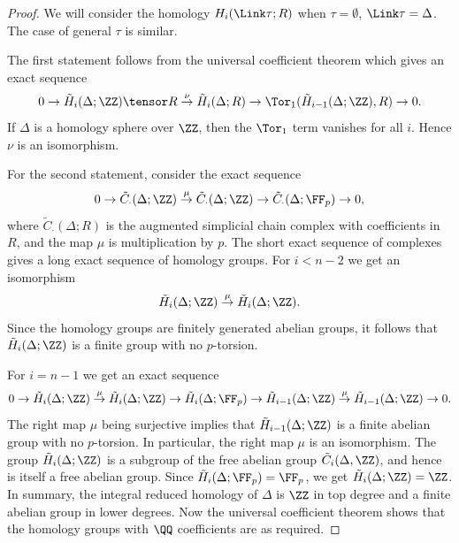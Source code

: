\begin{proof}
We will consider the homology $H_i(\Link\tau; R)$ when $\tau=\emptyset$, $\Link\tau=\Delta$. The case of general $\tau$ is similar.

The first statement follows from the universal coefficient theorem which gives an exact sequence
\[ 0\to \tilde{H}_i (\Delta; \ZZ) \tensor R \stackrel{\nu}{\to} \tilde{H}_i (\Delta; R) \to \Tor_1(\tilde{H}_{i-1} (\Delta; \ZZ), R) \to 0.\]
If $\Delta$ is a homology sphere over $\ZZ$, then the $\Tor_1$ term vanishes for all $i$. Hence $\nu$ is an isomorphism.

For the second statement, consider the exact sequence
\[  0\to \tilde{C}_\cdot(\Delta;\ZZ) \stackrel{\mu}{\to} \tilde{C}_\cdot(\Delta;\ZZ) \to \tilde{C}_\cdot(\Delta;\FF_p) \to 0,\]
where $\tilde{C}_\cdot(\Delta;R)$ is the augmented simplicial chain complex with coefficients in $R$, and the map $\mu$ is multiplication by $p$. The short exact sequence of complexes gives a long exact sequence of homology groups. For $i< n-2$ we get an isomorphism
\[ \tilde{H}_i(\Delta;\ZZ) \stackrel{\mu}{\to} \tilde{H}_i(\Delta;\ZZ).\]
Since the homology groups are finitely generated abelian groups, it follows that $\tilde{H}_i(\Delta;\ZZ)$ is a finite group with no $p$-torsion. 

For $i=n-1$ we get an exact sequence 
\[  0\to \tilde{H}_i(\Delta;\ZZ) \stackrel{\mu}{\to} \tilde{H}_i(\Delta;\ZZ) \to \tilde{H}_i(\Delta;\FF_p) \to \tilde{H}_{i-1}(\Delta;\ZZ) \stackrel{\mu}{\to} \tilde{H}_{i-1}(\Delta;\ZZ) \to 0.\]
The right map $\mu$ being surjective implies that $\tilde{H}_{i-1}(\Delta;\ZZ)$ is a finite abelian group with no $p$-torsion. In particular, the right map $\mu$ is an isomorphism. The group $\tilde{H}_i(\Delta;\ZZ)$ is a subgroup of the free abelian group $\tilde{C}_i(\Delta,\ZZ)$, and hence is itself a free abelian group. Since $\tilde{H}_i(\Delta;\FF_p) = \FF_p$, we get $\tilde{H}_i(\Delta;\ZZ) = \ZZ$.  In summary, the integral reduced homology of $\Delta$ is $\ZZ$ in top degree and a finite abelian group in lower degrees. Now the universal coefficient theorem shows that the  homology groups with $\QQ$ coefficients are as required.
\end{proof}

